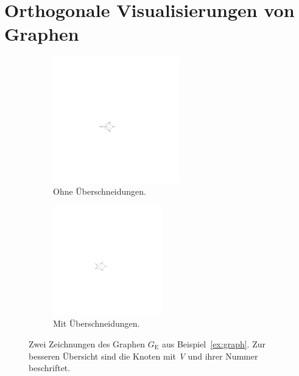 \documentclass[a4paper]{scrreprt}
\theoremstyle{definition}
\begin{document}
\section{Orthogonale Visualisierungen von Graphen}
\label{sec:orthogonalDrawings}

\begin{figure}[h]
        \centering
        \begin{subfigure}[b]{0.4\textwidth}
                \centering
                \includegraphics[width=0.6\textwidth]{exampleA/straightline}
                \caption{Ohne Überschneidungen.}
                \label{fig:exampleAstraightline}
        \end{subfigure}
        \quad
        \begin{subfigure}[b]{0.4\textwidth}
                \centering
                \includegraphics[width=0.52\textwidth]{exampleA/straightlineNonplanar}
                \caption{Mit Überschneidungen.}
                \label{fig:exampleAstraightlineNonplanar}
        \end{subfigure}
        \caption{Zwei Zeichnungen des Graphen $G_\text{E}$ aus Beispiel~\ref{ex:graph}. Zur besseren Übersicht sind die Knoten mit \emph{V} und ihrer Nummer beschriftet.}
\end{figure}
\end{document}
